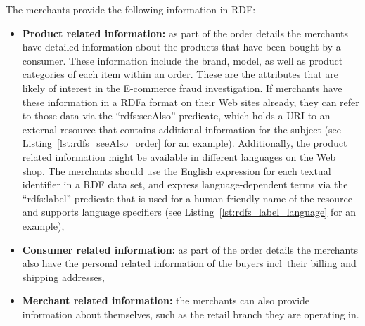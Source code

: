 The merchants provide the following information in \gls{RDF}:\@

\begin{itemize}
  \item \textbf{Product related information:} as part of the order details the merchants have detailed information about the products that have been bought by a consumer. These information include the brand, model, as well as product categories of each item within an order. These are the attributes that are likely of interest in the \gls{E-commerce} fraud investigation. If merchants have these information in a \gls{RDFa} format on their Web sites already, they can refer to those data via the ``rdfs:seeAlso'' predicate, which holds a \gls{URI} to an external resource that contains additional information for the subject (see Listing~\ref{lst:rdfs_seeAlso_order} for an example). Additionally, the product related information might be available in different languages on the Web shop. The merchants should use the English expression for each textual identifier in a \gls{RDF} data set, and express language-dependent terms via the ``rdfs:label'' predicate that is used for a human-friendly name of the resource and supports language specifiers (see Listing~\ref{lst:rdfs_label_language} for an example),
  \item \textbf{Consumer related information:} as part of the order details the merchants also have the personal related information of the buyers \gls{incl}\ their billing and shipping addresses,
  \item \textbf{Merchant related information:} the merchants can also provide information about themselves, such as the retail branch they are operating in.
\end{itemize}




